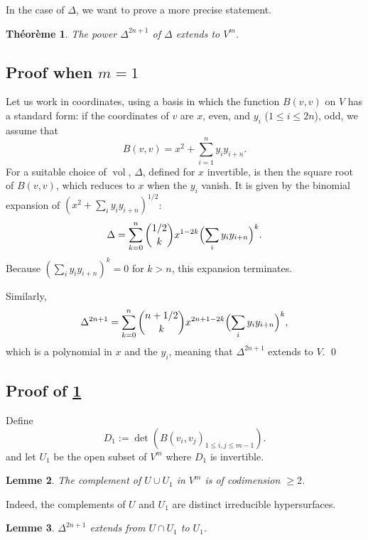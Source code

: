 \documentclass[11pt,a4paper]{article}
\theoremstyle{plain}
\newtheorem{theorem}{Th\'eor\`eme}
\newtheorem{lemma}[theorem]{Lemme}
\theoremstyle{definition}
\DeclareMathOperator{\vol}{vol}
\begin{document}
In the case of $\Delta$, we want to prove a more precise statement.

\begin{theorem}\label{thm:5.4}
The power $\Delta^{2n+1}$ of $\Delta$ extends to $V^m$.
\end{theorem}

\subsection{Proof when $m = 1$}
Let us work in coordinates, using a basis in which the function $B(v,v)$ on $V$ has a standard form: if the coordinates of $v$ are $x$, even, and $y_i$ ($1 \leq i \leq 2n$), odd, we assume that
\begin{equation}\label{eq:5.4.1}
B(v,v) = x^2 + \sum_{i=1}^{n} y_i y_{i+n}.
\end{equation}
For a suitable choice of $\vol$, $\Delta$, defined for $x$ invertible, is then the square root of $B(v,v)$, which reduces to $x$ when the $y_i$ vanish. It is given by the binomial expansion of $(x^2 + \sum_i y_i y_{i+n})^{1/2}$:
\begin{equation}\label{eq:5.4.2}
\Delta = \sum_{k=0}^{n} \binom{1/2}{k} x^{1-2k} \Bigl(\sum_i y_i y_{i+n}\Bigr)^k.
\end{equation}
Because $(\sum_i y_i y_{i+n})^k = 0$ for $k > n$, this expansion terminates.

Similarly,
\begin{equation}\label{eq:5.4.3}
\Delta^{2n+1} = \sum_{k=0}^{n} \binom{n+1/2}{k} x^{2n+1-2k} \Bigl(\sum_i y_i y_{i+n}\Bigr)^k,
\end{equation}
which is a polynomial in $x$ and the $y_i$, meaning that $\Delta^{2n+1}$ extends to $V$.
\qed

\subsection{Proof of \ref{thm:5.4}}
Define
\[
D_1 := \det(B(v_i, v_j)_{1 \leq i,j \leq m-1}).
\]
and let $U_1$ be the open subset of $V^m$ where $D_1$ is invertible.

\begin{lemma}\label{lem:5.6}
The complement of $U \cup U_1$ in $V^m$ is of codimension $\geq 2$.
\end{lemma}

Indeed, the complements of $U$ and $U_1$ are distinct irreducible hypersurfaces.

\begin{lemma}\label{lem:5.7}
$\Delta^{2n+1}$ extends from $U \cap U_1$ to $U_1$.
\end{lemma}
\end{document}
